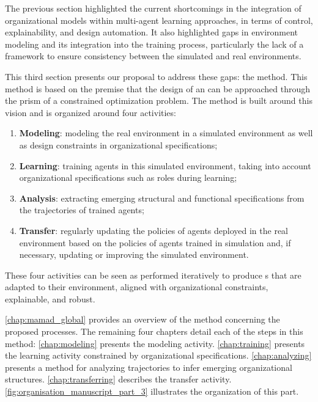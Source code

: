 \noindent

The previous section highlighted the current shortcomings in the integration of organizational models within multi-agent learning approaches, in terms of control, explainability, and design automation. It also highlighted gaps in environment modeling and its integration into the training process, particularly the lack of a framework to ensure consistency between the simulated and real environments.

\medskip

\noindent
This third section presents our proposal to address these gaps: the  method. This method is based on the premise that the design of an  can be approached through the prism of a constrained optimization problem. The method is built around this vision and is organized around four activities:

\begin{enumerate}
  \item \textbf{Modeling}: modeling the real environment in a simulated environment as well as design constraints in organizational specifications;
  \item \textbf{Learning}: training agents in this simulated environment, taking into account organizational specifications such as roles during learning;
  \item \textbf{Analysis}: extracting emerging structural and functional specifications from the trajectories of trained agents;
  \item \textbf{Transfer}: regularly updating the policies of agents deployed in the real environment based on the policies of agents trained in simulation and, if necessary, updating or improving the simulated environment.
\end{enumerate}

\noindent
These four activities can be seen as performed iteratively to produce s that are adapted to their environment, aligned with organizational constraints, explainable, and robust.

\medskip

\noindent
\autoref{chap:mamad_global} provides an overview of the method concerning the proposed processes. The remaining four chapters detail each of the steps in this method:
\autoref{chap:modeling} presents the modeling activity.
\autoref{chap:training} presents the learning activity constrained by organizational specifications.
\autoref{chap:analyzing} presents a method for analyzing trajectories to infer emerging organizational structures.
\autoref{chap:transferring} describes the transfer activity.
\autoref{fig:organisation_manuscript_part_3} illustrates the organization of this part.

